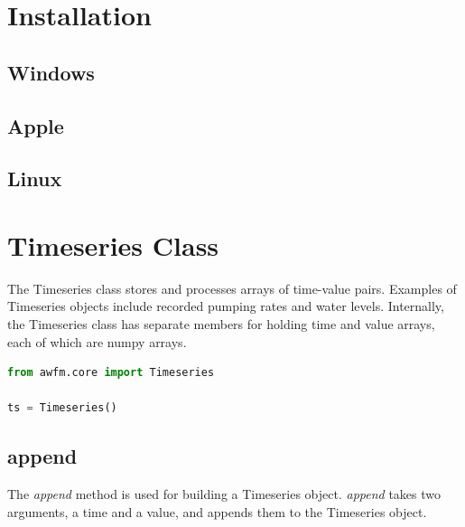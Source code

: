 \documentclass{tufte-book} %
\begin{document}

\chapter{Installation}


\section{Windows}
\lipsum[6-7]

\section{Apple}
\lipsum[6-7]

\section{Linux}
\lipsum[7-8]

\chapter{Timeseries Class}

The Timeseries class stores and processes arrays of time-value pairs. Examples of
Timeseries objects include recorded pumping rates and water levels. Internally, the
Timeseries class has separate members for holding time and value arrays, each of
which are numpy arrays.

\begin{lstlisting}[language=python]
from awfm.core import Timeseries

ts = Timeseries()
\end{lstlisting}

\section{append}
The \emph{append} method is used for building a Timeseries object. \emph{append}
takes two arguments, a time and a value, and appends them to the 
Timeseries object.
\end{document}
